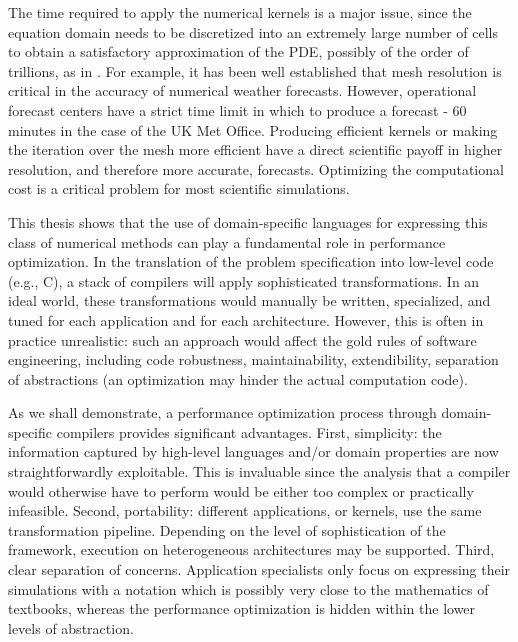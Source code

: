 The time required to apply the numerical kernels is a major issue, since the equation domain needs to be discretized into an extremely large number of cells to obtain a satisfactory approximation of the PDE, possibly of the order of trillions, as in \cite{Rossinelli2013}. For example, it has been well established that mesh resolution is critical in the accuracy of numerical weather forecasts. However, operational forecast centers have a strict time limit in which to produce a forecast - 60 minutes in the case of the UK Met Office. Producing efficient kernels or making the iteration over the mesh more efficient have a direct scientific payoff in higher resolution, and therefore more accurate, forecasts. Optimizing the computational cost is a critical problem for most scientific simulations. 

This thesis shows that the use of domain-specific languages for expressing this class of numerical methods can play a fundamental role in performance optimization. In the translation of the problem specification into low-level code (e.g., C), a stack of compilers will apply sophisticated transformations. In an ideal world, these transformations would manually be written, specialized, and tuned for each application and for each architecture. However, this is often in practice unrealistic: such an approach would affect the gold rules of software engineering, including code robustness, maintainability, extendibility, separation of abstractions (an optimization may hinder the actual computation code). 

As we shall demonstrate, a performance optimization process through domain-specific compilers provides significant advantages. First, simplicity: the information captured by high-level languages and/or domain properties are now straightforwardly exploitable. This is invaluable since the analysis that a compiler would otherwise have to perform would be either too complex or practically infeasible. Second, portability: different applications, or kernels, use the same transformation pipeline. Depending on the level of sophistication of the framework, execution on heterogeneous architectures may be supported. Third, clear separation of concerns. Application specialists only focus on expressing their simulations with a notation which is possibly very close to the mathematics of textbooks, whereas the performance optimization is hidden within the lower levels of abstraction. 


